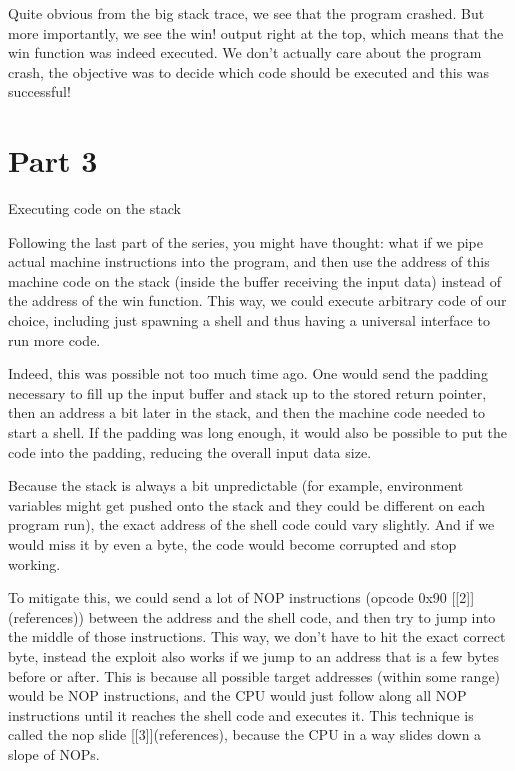         Quite obvious from the big stack trace, we see that the program crashed. But more importantly, we see the win! output
        right at the top, which means that the win function was indeed executed. We don't actually care about the program
        crash, the objective was to decide which code should be executed and this was successful!




        \section{Part 3}

        Executing code on the stack

        Following the last part of the series, you might have thought: what if we pipe actual machine instructions into the
        program, and then use the address of this machine code on the stack (inside the buffer receiving the input data) instead
        of the address of the win function. This way, we could execute arbitrary code of our choice, including just spawning
        a shell and thus having a universal interface to run more code.

        Indeed, this was possible not too much time ago. One would send the padding necessary to fill up the input buffer and
        stack up to the stored return pointer, then an address a bit later in the stack, and then the machine code needed to
        start a shell. If the padding was long enough, it would also be possible to put the code into the padding, reducing the
        overall input data size.

        Because the stack is always a bit unpredictable (for example, environment variables might get pushed onto the stack and
        they could be different on each program run), the exact address of the shell code could vary slightly. And if we would
        miss it by even a byte, the code would become corrupted and stop working.

        To mitigate this, we could send a lot of NOP instructions (opcode 0x90 [[2]](references)) between the address and the shell code, and
        then try to jump into the middle of those instructions. This way, we don't have to hit the exact correct byte, instead
        the exploit also works if we jump to an address that is a few bytes before or after. This is because all possible
        target addresses (within some range) would be NOP instructions, and the CPU would just follow along all NOP
        instructions until it reaches the shell code and executes it. This technique is called the nop slide [[3]](references), because the CPU in
        a way slides down a slope of NOPs.

